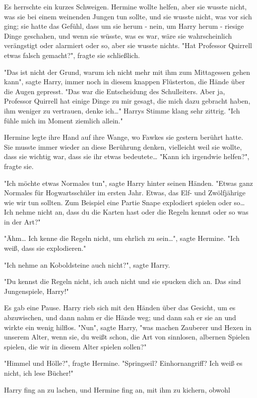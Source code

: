 {Es herrschte ein kurzes Schweigen. Hermine wollte helfen, aber sie wusste nicht, was sie bei einem weinenden Jungen tun sollte, und sie wusste nicht, was vor sich ging; sie hatte das Gefühl, dass um sie herum - nein, um Harry herum - riesige Dinge geschahen, und wenn sie wüsste, was es war, wäre sie wahrscheinlich verängstigt oder alarmiert oder so, aber sie wusste nichts. "Hat Professor Quirrell etwas falsch gemacht?", fragte sie schließlich.

"Das ist nicht der Grund, warum ich nicht mehr mit ihm zum Mittagessen gehen kann", sagte Harry, immer noch in diesem knappen Flüsterton, die Hände über die Augen gepresst. "Das war die Entscheidung des Schulleiters. Aber ja, Professor Quirrell hat einige Dinge zu mir gesagt, die mich dazu gebracht haben, ihm weniger zu vertrauen, denke ich…" Harrys Stimme klang sehr zittrig. "Ich fühle mich im Moment ziemlich allein."

Hermine legte ihre Hand auf ihre Wange, wo Fawkes sie gestern berührt hatte. Sie musste immer wieder an diese Berührung denken, vielleicht weil sie wollte, dass sie wichtig war, dass sie ihr etwas bedeutete… "Kann ich irgendwie helfen?", fragte sie.

"Ich möchte etwas Normales tun", sagte Harry hinter seinen Händen. "Etwas ganz Normales für Hogwartsschüler im ersten Jahr. Etwas, das Elf- und Zwölfjährige wie wir tun sollten. Zum Beispiel eine Partie Snape explodiert spielen oder so… Ich nehme nicht an, dass du die Karten hast oder die Regeln kennst oder so was in der Art?"

"Ähm… Ich kenne die Regeln nicht, um ehrlich zu sein…", sagte Hermine. "Ich weiß, dass sie explodieren."

"Ich nehme an Koboldsteine auch nicht?", sagte Harry.

"Du kennst die Regeln nicht, ich auch nicht und sie spucken dich an. Das sind Jungenspiele, Harry!"

Es gab eine Pause. Harry rieb sich mit den Händen über das Gesicht, um es abzuwischen, und dann nahm er die Hände weg; und dann sah er sie an und wirkte ein wenig hilflos. "Nun", sagte Harry, "was machen Zauberer und Hexen in unserem Alter, wenn sie, du weißt schon, die Art von sinnlosen, albernen Spielen spielen, die wir in diesem Alter spielen sollen?"

"Himmel und Hölle?", fragte Hermine. "Springseil? Einhornangriff? Ich weiß es nicht, ich lese Bücher!"

Harry fing an zu lachen, und Hermine fing an, mit ihm zu kichern, obwohl

}
